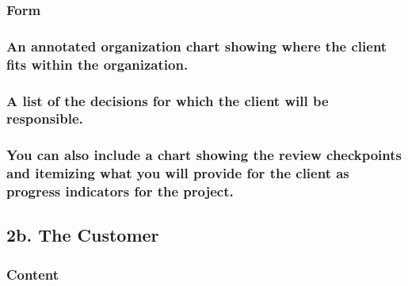 \documentclass[
]{article}
\begin{document}
\hypertarget{form-2}{%
\subsubsection{Form}\label{form-2}}

\hypertarget{an-annotated-organization-chart-showing-where-the-client-fits-within-the-organization.}{%
\subsubsection{\texorpdfstring{An annotated organization chart showing
where the client fits within the organization.
}{An annotated organization chart showing where the client fits within the organization. }}\label{an-annotated-organization-chart-showing-where-the-client-fits-within-the-organization.}}

\hypertarget{a-list-of-the-decisions-for-which-the-client-will-be-responsible.}{%
\subsubsection{\texorpdfstring{A list of the decisions for which the
client will be responsible.
}{A list of the decisions for which the client will be responsible. }}\label{a-list-of-the-decisions-for-which-the-client-will-be-responsible.}}

\hypertarget{you-can-also-include-a-chart-showing-the-review-checkpoints-and-itemizing-what-you-will-provide-for-the-client-as-progress-indicators-for-the-project.}{%
\subsubsection{\texorpdfstring{You can also include a chart showing the
review checkpoints and itemizing what you will provide for the client as
progress indicators for the project.
}{You can also include a chart showing the review checkpoints and itemizing what you will provide for the client as progress indicators for the project. }}\label{you-can-also-include-a-chart-showing-the-review-checkpoints-and-itemizing-what-you-will-provide-for-the-client-as-progress-indicators-for-the-project.}}

\hypertarget{b.-the-customer}{%
\subsection{\texorpdfstring{2b. The Customer
}{2b. The Customer }}\label{b.-the-customer}}

\hypertarget{content-3}{%
\subsubsection{Content}\label{content-3}}
\end{document}
